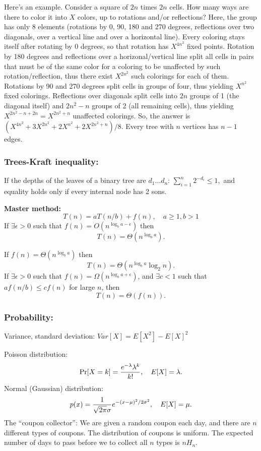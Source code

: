 \documentclass[12pt]{extarticle}
\begin{document}
\begin{multicols*}{2}
			Here's an example. Consider a square of $2n$ times $2n$ cells. How many ways
			are there to color it into $X$ colors, up to rotations and/or reflections?
			Here, the group has only 8 elements (rotations by 0, 90, 180 and 270 degrees,
			reflections over two diagonals, over a vertical line and over a horizontal
			line). Every coloring stays itself after rotating by 0 degrees, so that
			rotation has $X^{4n^2}$ fixed points. Rotation by 180 degrees and reflections
			over a horizonal/vertical line split all cells in pairs that must be of the
			same color for a coloring to be unaffected by such rotation/reflection, thus
			there exist $X^{2n^2}$ such colorings for each of them. Rotations by 90 and 270
			degrees split cells in groups of four, thus yielding $X^{n^2}$ fixed colorings.
			Reflections over diagonals split cells into $2n$ groups of 1 (the diagonal
			itself) and $2n^2-n$ groups of 2 (all remaining cells), thus yielding
			$X^{2n^2-n+2n}=X^{2n^2+n}$ unaffected colorings.  So, the answer is
			$(X^{4n^2}+3X^{2n^2}+2X^{n^2}+2X^{2n^2+n})/8$.
			Every tree with $n$ vertices has $n-1$ edges.
			
			\subsubsection*{Trees-Kraft inequality:}
			If the depths of the leaves of a binary tree are $d_1 \ldots d_n$:
			$
			\sum_{i=1}^n 2^{- d_i} \leq 1,
			$
			and equality holds only if every internal node has 2 sons.
			
			\par\vskip 5pt
			
			\textbf{Master method:}
			$$T(n) = aT(n/b) + f(n), \quad a\geq 1, b > 1$$
			If $\exists \epsilon > 0$ such that $f(n) = O(n^{\log_b a - \epsilon})$ then
			$$T(n) = \Theta(n^{\log_b a}).$$
			\par
			If $f(n) = \Theta(n^{\log_b a})$ then
			$$T(n) = \Theta(n^{\log_b a} \log_2 n).$$
			If $\exists \epsilon > 0$ such that $f(n) = \Omega(n^{\log_b a + \epsilon})$,
			and $\exists c < 1$ such that $a f(n/b) \leq cf(n)$ for large $n$,
			then
			$$T(n) = \Theta(f(n)).$$
			\par
			\subsubsection*{Probability:}
			\par\vskip 5pt
			Variance, standard deviation:
			$Var[X] = E[X^2] - E[X]^2$
			\par\vskip 5pt
			Poisson distribution:
			$$
			\Pr[X = k] = {e^{-\lambda} \lambda^k \over k!}, \quad  E[X] = \lambda.
			$$
			Normal (Gaussian) distribution:
			$$
			p(x) = {1 \over \sqrt{2 \pi} \sigma} e^{-(x-\mu)^2/2\sigma^2}, \quad E[X] = \mu.
			$$
			The ``coupon collector'':
			We are given a random coupon each day,
			and there are $n$ different types of coupons.
			The distribution of coupons is uniform.
			The expected number of days to pass before we to collect all $n$ types is $n H_n.$
		\end{multicols*}
\end{document}
